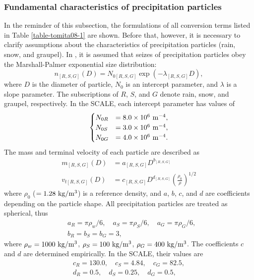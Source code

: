 \subsubsection{Fundamental characteristics of precipitation particles}
In the reminder of this subsection, the formulations of all conversion terms listed in Table \ref{table-tomita08-1} are shown.
Before that, however, it is necessary to clarify assumptions about the characteristics of precipitation particles (rain, snow, and graupel).
In \citet{tomita_2008}, it is assumed that seizes of precipitation particles obey the Marshall-Palmer exponential size distribution:
\begin{equation}
  n_{[R,S,G]}(D) = N_{0[R,S,G]}\exp(-\lambda_{[R,S,G]}D)\label{eq:size_dist},
\end{equation}
where $D$ is the diameter of particle, $N_{0}$ is an intercept parameter, and $\lambda$ is a slope parameter. The subscriptions of $R$, $S$, and $G$ denote rain, snow, and graupel, respectively. In the SCALE, each intercept parameter has values of
\begin{align}
\begin{cases}
  N_{0R}&=8.0\times 10^{6}{\rm \ m^{-4}}, \\ 
  N_{0S}&=3.0\times 10^{6}{\rm \ m^{-4}}, \\ 
  N_{0G}&=4.0\times 10^{6}{\rm \ m^{-4}}.
\end{cases}
\end{align}
The mass and terminal velocity of each particle are described as
\begin{align}
  m_{[R,S,G]}(D) &= a_{[R,S,G]}D^{b_{[R,S,G]}}\label{eq:particle_mass} \\
  v_{t[R,S,G]}(D) &= c_{[R,S,G]}D^{d_{[R,S,G]}}\left(\frac{\rho_{0}}{\rho}\right)^{1/2}
\end{align}
where $\rho_{0}$ ($=1.28\rm \ kg/m^{3}$) is a reference density, and $a$, $b$, $c$, and $d$ are coefficients depending on the particle shape. All precipitation particles are treated as spherical, thus
\begin{align}
  &a_{R}=\pi \rho_{w}/6,\quad a_{S}=\pi \rho_{S}/6,\quad a_{G}=\pi \rho_{G}/6, \\
  &b_{R}=b_{S}=b_{G}=3,
\end{align}
where $\rho_{w}=1000 {\rm \ kg/m^{3}}$, $\rho_{S}=100 {\rm \ kg/m^{3}}$, $\rho_{G}=400 {\rm \ kg/m^{3}}$. The coefficients $c$ and $d$ are determined empirically. In the SCALE, their values are
\begin{align}
  c_{R}=130.0,\quad c_{S}=4.84,\quad c_{G}=82.5, \\
  d_{R}=0.5,\quad d_{S}=0.25,\quad d_{G}=0.5,
\end{align}
